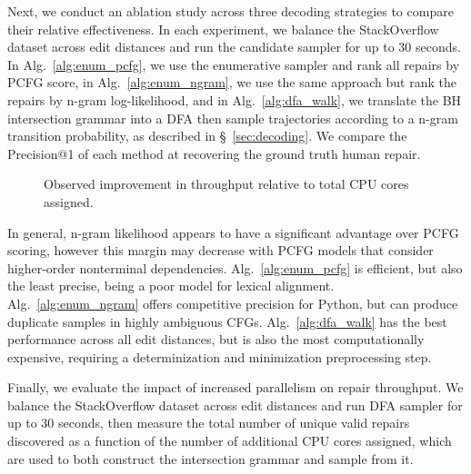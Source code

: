 \documentclass[runningheads]{llncs}
\begin{document}
  Next, we conduct an ablation study across three decoding strategies to compare their relative effectiveness. In each experiment, we balance the StackOverflow dataset across edit distances and run the candidate sampler for up to 30 seconds. In Alg.~\ref{alg:enum_pcfg}, we use the enumerative sampler and rank all repairs by PCFG score, in Alg.~\ref{alg:enum_ngram}, we use the same approach but rank the repairs by n-gram log-likelihood, and in Alg.~\ref{alg:dfa_walk}, we translate the BH intersection grammar into a DFA then sample trajectories according to a n-gram transition probability, as described in \S~\ref{sec:decoding}. We compare the Precision@1 of each method at recovering the ground truth human repair.

  \begin{figure}[h]
      \resizebox{\textwidth}{!}{
    
    
    
      }
  \end{figure}

\begin{wrapfigure}{r}{0.4\textwidth}
  \vspace{-0.7cm}
  
  \vspace{-0.5cm}
  \caption{Observed improvement in throughput relative to total CPU cores assigned.}
  \label{fig:speedup}
  \vspace{-1.0cm}
\end{wrapfigure}

  In general, n-gram likelihood appears to have a significant advantage over PCFG scoring, however this margin may decrease with PCFG models that consider higher-order nonterminal dependencies. Alg.~\ref{alg:enum_pcfg} is efficient, but also the least precise, being a poor model for lexical alignment. Alg.~\ref{alg:enum_ngram} offers competitive precision for Python, but can produce duplicate samples in highly ambiguous CFGs. Alg.~\ref{alg:dfa_walk} has the best performance across all edit distances, but is also the most computationally expensive, requiring a determinization and minimization preprocessing step.

  Finally, we evaluate the impact of increased parallelism on repair throughput. We balance the StackOverflow dataset across edit distances and run DFA sampler for up to 30 seconds, then measure the total number of unique valid repairs discovered as a function of the number of additional CPU cores assigned, which are used to both construct the intersection grammar and sample from it.
\end{document}
